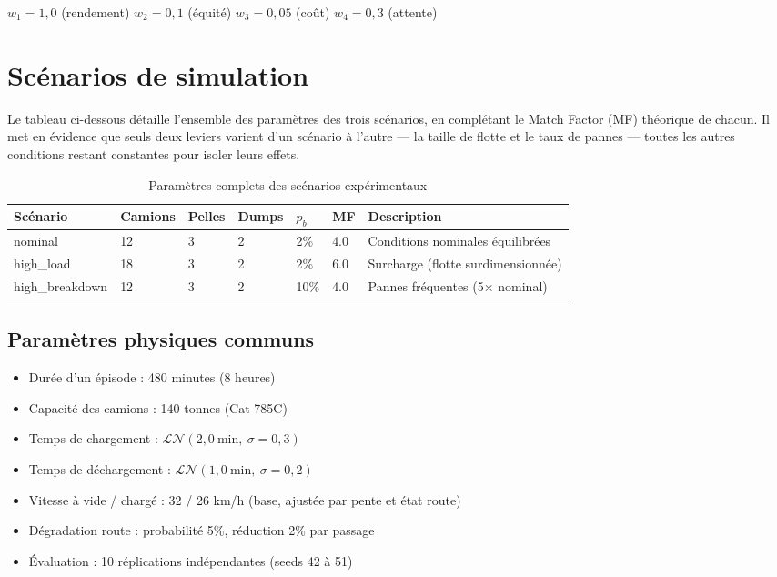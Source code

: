 \documentclass[11pt,a4paper]{report}
\begin{document}
\begin{center}
$w_1 = 1{,}0$ (rendement) \quad $w_2 = 0{,}1$ (équité) \quad $w_3 = 0{,}05$ (coût) \quad $w_4 = 0{,}3$ (attente)
\end{center}

\chapter{Scénarios de simulation}
\label{ann:scenarios}

Le tableau ci-dessous d\'etaille l'ensemble des param\`etres des trois sc\'enarios, en compl\'etant le Match Factor (MF) th\'eorique de chacun. Il met en \'evidence que seuls deux leviers varient d'un sc\'enario \`a l'autre --- la taille de flotte et le taux de pannes --- toutes les autres conditions restant constantes pour isoler leurs effets.

\begin{table}[H]
\centering
\caption{Paramètres complets des scénarios expérimentaux}
\begin{tabular}{lllllll}
\toprule
\textbf{Scénario} & \textbf{Camions} & \textbf{Pelles} & \textbf{Dumps} & \textbf{$p_b$} & \textbf{MF} & \textbf{Description} \\
\midrule
nominal & 12 & 3 & 2 & 2\% & 4.0 & Conditions nominales équilibrées \\
high\_load & 18 & 3 & 2 & 2\% & 6.0 & Surcharge (flotte surdimensionnée) \\
high\_breakdown & 12 & 3 & 2 & 10\% & 4.0 & Pannes fréquentes (5× nominal) \\
\bottomrule
\end{tabular}
\end{table}

\section*{Paramètres physiques communs}

\begin{itemize}
    \item Durée d'un épisode : 480 minutes (8 heures)
    \item Capacité des camions : 140 tonnes (Cat 785C)
    \item Temps de chargement : $\mathcal{LN}(2{,}0~\text{min},\ \sigma = 0{,}3)$
    \item Temps de déchargement : $\mathcal{LN}(1{,}0~\text{min},\ \sigma = 0{,}2)$
    \item Vitesse à vide / chargé : 32 / 26 km/h (base, ajustée par pente et état route)
    \item Dégradation route : probabilité 5\%, réduction 2\% par passage
    \item Évaluation : 10 réplications indépendantes (seeds 42 à 51)
\end{itemize}
\end{document}
